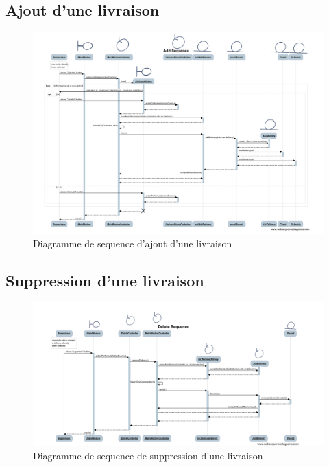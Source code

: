 \begin{landscape}
    \subsection{Ajout d'une livraison}

    \begin{figure}[h]
        \centering
        \includegraphics[width=160mm]{../diagrams/sequences/addsequence.png}
        \caption{Diagramme de sequence d'ajout d'une livraison}
        \label{diagram:seq_add_delivery}
    \end{figure}
\end{landscape}
\pagebreak

\begin{landscape}
    \subsection{Suppression d'une livraison}

    \begin{figure}[h]
        \centering
        \includegraphics[width=220mm]{../diagrams/sequences/delsequence.png}
        \caption{Diagramme de sequence de suppression d'une livraison}
        \label{diagram:seq_del_delivery}
    \end{figure}
\end{landscape}
\pagebreak
